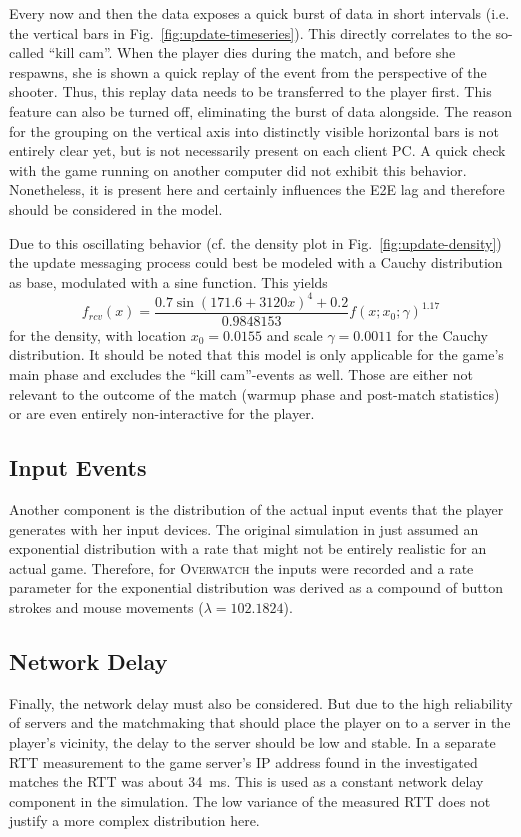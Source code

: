 	Every now and then the data exposes a quick burst of data in short intervals (i.e. the vertical bars in Fig.~\ref{fig:update-timeseries}). This directly correlates to the so-called ``kill cam''. When the player dies during the match, and before she respawns, she is shown a quick replay of the event from the perspective of the shooter. Thus, this replay data needs to be transferred to the player first. This feature can also be turned off, eliminating the burst of data alongside.	The reason for the grouping on the vertical axis into distinctly visible horizontal bars is not entirely clear yet, but is not necessarily present on each client PC. A quick check with the game running on another computer did not exhibit this behavior. Nonetheless, it is present here and certainly influences the \gls{E2E} lag and therefore should be considered in the model.

	Due to this oscillating behavior (cf. the density plot in Fig.~\ref{fig:update-density}) the update messaging process could best be modeled with a Cauchy distribution as base, modulated with a sine function. This yields
	\begin{equation*}
		f_{rcv}(x) = \frac{0.7\sin(171.6 +3120x)^4 + 0.2}{0.9848153} f(x; x_0; \gamma)^{1.17} 
	\end{equation*}
	for the density, with location $x_0 = 0.0155$ and scale $\gamma = 0.0011$ for the Cauchy distribution. It should be noted that this model is only applicable for the game's main phase and excludes the ``kill cam''-events as well. Those are either not relevant to the outcome of the match (warmup phase and post-match statistics) or are even entirely non-interactive for the player.



\subsection{Input Events}

Another component is the distribution of the actual input events that the player generates with her input devices. The original simulation in \cite{Metzger+2016} just assumed an exponential distribution with a rate that might not be entirely realistic for an actual game. Therefore, for \textsc{Overwatch} the inputs were recorded and a rate parameter for the exponential distribution was derived as a compound of button strokes and mouse movements ($\lambda = 102.1824$).


\subsection{Network Delay}

Finally, the network delay must also be considered. But due to the high reliability of servers and the matchmaking that should place the player on to a server in the player's vicinity, the delay to the server should be low and stable. In a separate RTT measurement to the game server's IP address found in the investigated matches the RTT was about \SI{34}{\milli\second}. This is used as a constant network delay component in the simulation. The low variance of the measured RTT does not justify a more complex distribution here.

